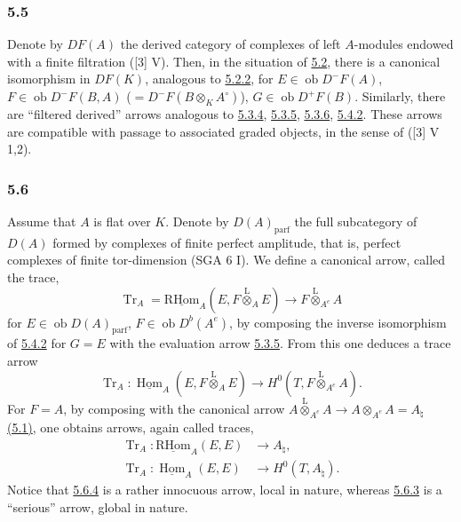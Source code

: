 \documentclass[11pt]{article}
\providecommand{\uHom}{\underline{\Hom}}
\providecommand{\uRHom}{\underline{\RHom}}
\DeclareMathOperator{\Hom}{Hom}
\newcommand{\ob}{\operatorname{ob}}
\providecommand{\RHom}{\mathrm{RHom}}
\providecommand{\Tr}{\operatorname{Tr}}
\providecommand{\Tr}{\operatorname{Tr}}
\providecommand{\lten}{\overset{\mathrm L}{\otimes}}
\providecommand{\Tr}{\operatorname{Tr}}
\providecommand{\RHom}{\mathrm{RHom}}
\providecommand{\Hom}{\operatorname{Hom}}
\providecommand{\ob}{\operatorname{ob}}
\providecommand{\lten}{\overset{\mathrm L}{\otimes}}
\providecommand{\RHom}{\mathrm R\mathcal{H}om}
\providecommand{\lten}{\overset{\mathrm L}{\otimes}}
\providecommand{\Tr}{\operatorname{Tr}}
\providecommand{\lten}{\overset{\mathrm L}{\otimes}}
\providecommand{\lten}{\overset{\mathrm L}{\otimes}}
\providecommand{\lten}{\overset{\mathrm L}{\otimes}}
\providecommand{\RHom}{\mathrm{RHom}}
\providecommand{\Hom}{\operatorname{Hom}}
\providecommand{\Tr}{\operatorname{Tr}}
\providecommand{\lten}{\overset{\mathrm L}{\otimes}}
\begin{document}
\subsubsection*{5.5}\label{sga5:IIIB:subsubsection:5.5}

Denote by $DF(A)$ the derived category of complexes of left $A$-modules endowed with a finite filtration ([3] V). Then, in the situation of \hyperref[sga5:IIIB:subsubsection:5.2]{5.2}, there is a canonical isomorphism in $DF(K)$, analogous to \hyperref[sga5:IIIB:equation:5.2.2]{5.2.2}, for $E\in\ob D^-F(A)$, $F\in\ob D^-F(B,A)$ ($=D^-F(B\otimes_KA^\circ)$), $G\in\ob D^+F(B)$. Similarly, there are ``filtered derived'' arrows analogous to \hyperref[sga5:IIIB:equation:5.3.4]{5.3.4}, \hyperref[sga5:IIIB:equation:5.3.5]{5.3.5}, \hyperref[sga5:IIIB:equation:5.3.6]{5.3.6}, \hyperref[sga5:IIIB:equation:5.4.2]{5.4.2}. These arrows are compatible with passage to associated graded objects, in the sense of ([3] V 1,2).

\subsubsection*{5.6}\label{sga5:IIIB:subsubsection:5.6}

Assume that $A$ is flat over $K$. Denote by $D(A)_{\mathrm{parf}}$ the full subcategory of $D(A)$ formed by complexes of finite perfect amplitude, that is, perfect complexes of finite tor-dimension (SGA 6 I). We define a canonical arrow, called the trace,
\begin{equation}\tag{5.6.1}\label{sga5:IIIB:equation:5.6.1}
\Tr_A=\uRHom_A(E,F\lten_AE)\longrightarrow F\lten_{A^e}A
\end{equation}
for $E\in\ob D(A)_{\mathrm{parf}}$, $F\in\ob D^b(A^e)$, by composing the inverse isomorphism of \hyperref[sga5:IIIB:equation:5.4.2]{5.4.2} for $G=E$ with the evaluation arrow \hyperref[sga5:IIIB:equation:5.3.5]{5.3.5}. From this one deduces a trace arrow
\begin{equation}\tag{5.6.2}\label{sga5:IIIB:equation:5.6.2}
\Tr_A:\uHom_A(E,F\lten_AE)\longrightarrow H^0(T,F\lten_{A^e}A).
\end{equation}
For $F=A$, by composing with the canonical arrow $A\lten_{A^e}A\to A\otimes_{A^e}A=A_\natural$ \hyperref[sga5:IIIB:subsubsection:5.1]{(5.1)}, one obtains arrows, again called traces,
\begin{align}
\Tr_A:\uRHom_A(E,E)&\longrightarrow A_\natural,\tag{5.6.3}\label{sga5:IIIB:equation:5.6.3}\\
\Tr_A:\uHom_A(E,E)&\longrightarrow H^0(T,A_\natural).\tag{5.6.4}\label{sga5:IIIB:equation:5.6.4}
\end{align}
Notice that \hyperref[sga5:IIIB:equation:5.6.4]{5.6.4} is a rather innocuous arrow, local in nature, whereas \hyperref[sga5:IIIB:equation:5.6.3]{5.6.3} is a ``serious'' arrow, global in nature.
\end{document}
